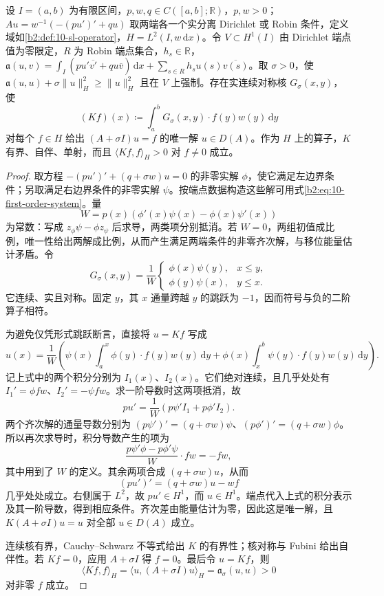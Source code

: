 \begin{proposition}[移位 Green 算子]\label{b2:prop:10-green-resolvent}
设 \(I=(a,b)\) 为有限区间，\(p,w,q\in C([a,b];\mathbb R)\)，\(p,w>0\)；\(Au=w^{-1}(-(pu')'+qu)\) 取两端各一个实分离 Dirichlet 或 Robin 条件，定义域如\cref{b2:def:10-sl-operator}，\(H=L^2(I,w\,\mathrm dx)\)。令 \(V\subset H^1(I)\) 由 Dirichlet 端点值为零限定，\(R\) 为 Robin 端点集合，\(h_s\in\mathbb R\)，\(\mathfrak a(u,v)=\int_I(pu'\overline{v'}+qu\overline v)\,\mathrm dx+\sum_{s\in R}h_su(s)\overline{v(s)}\)。取 \(\sigma>0\)，使 \(\mathfrak a(u,u)+\sigma\|u\|_H^2\geq\|u\|_H^2\) 且在 \(V\) 上强制。存在实连续对称核 \(G_\sigma(x,y)\)，使
\[
 (Kf)(x)\coloneqq\int_a^bG_\sigma(x,y)\cdot f(y)w(y)\,\mathrm{d}y
\]
对每个 \(f\in H\) 给出 \((A+\sigma I)u=f\) 的唯一解 \(u\in D(A)\)。作为 \(H\) 上的算子，\(K\) 有界、自伴、单射，而且 \(\langle Kf,f\rangle_H>0\) 对 \(f\ne0\) 成立。
\end{proposition}
\begin{proof}
取方程 \(-(pu')'+(q+\sigma w)u=0\) 的非零实解 \(\phi\)，使它满足左边界条件；另取满足右边界条件的非零实解 \(\psi\)。按端点数据构造这些解可用式\eqref{b2:eq:10-first-order-system}。量
\[
 W=p(x)\left(\phi'(x)\psi(x)-\phi(x)\psi'(x)\right)
\]
为常数：写成 \(z_\phi\psi-\phi z_\psi\) 后求导，两类项分别抵消。若 \(W=0\)，两组初值成比例，唯一性给出两解成比例，从而产生满足两端条件的非零齐次解，与移位能量估计矛盾。令
\[
 G_\sigma(x,y)=\dfrac1W
 \begin{cases}
 \phi(x)\psi(y),&x\leq y,\\
 \phi(y)\psi(x),&y\leq x.
 \end{cases}
\]
它连续、实且对称。固定 \(y\)，其 \(x\) 通量跨越 \(y\) 的跳跃为 \(-1\)，因而符号与负的二阶算子相符。

为避免仅凭形式跳跃断言，直接将 \(u=Kf\) 写成
\[
 u(x)=\dfrac1W\left(
 \psi(x)\int_a^x\phi(y)\cdot f(y)w(y)\,\mathrm{d}y
 +\phi(x)\int_x^b\psi(y)\cdot f(y)w(y)\,\mathrm{d}y\right).
\]
记上式中的两个积分分别为 \(I_1(x)\)、\(I_2(x)\)。它们绝对连续，且几乎处处有 \(I_1'=\phi fw\)、\(I_2'=-\psi fw\)。求一阶导数时这两项抵消，故
\[
 pu'=\dfrac1W\left(p\psi'I_1+p\phi'I_2\right).
\]
两个齐次解的通量导数分别为 \((p\psi')'=(q+\sigma w)\psi\)、\((p\phi')'=(q+\sigma w)\phi\)。所以再次求导时，积分导数产生的项为
\[
 \dfrac{p\psi'\phi-p\phi'\psi}{W}\cdot fw=-fw,
\]
其中用到了 \(W\) 的定义。其余两项合成 \((q+\sigma w)u\)，从而
\[
 (pu')'=(q+\sigma w)u-wf
\]
几乎处处成立。右侧属于 \(L^2\)，故 \(pu'\in H^1\)，而 \(u\in H^1\)。端点代入上式的积分表示及其一阶导数，得到相应条件。齐次差由能量估计为零，因此这是唯一解，且 \(K(A+\sigma I)u=u\) 对全部 \(u\in D(A)\) 成立。

连续核有界，Cauchy--Schwarz 不等式给出 \(K\) 的有界性；核对称与 Fubini 给出自伴性。若 \(Kf=0\)，应用 \(A+\sigma I\) 得 \(f=0\)。最后令 \(u=Kf\)，则
\[
 \langle Kf,f\rangle_H
 =\langle u,(A+\sigma I)u\rangle_H
 =\mathfrak a_\sigma(u,u)>0
\]
对非零 \(f\) 成立。
\end{proof}

